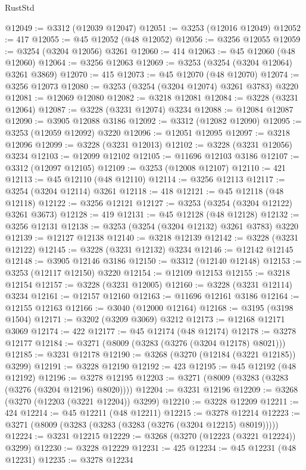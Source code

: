 \begin{lexlean}{RustStd}
\begin{coremodule}
@12049 := @3312 (@12039 @12047)
@12051 := @3253 (@12016 @12049)
@12052 := 417
@12055 := @45 @12052 (@48 @12052)
@12056 := @3256 @12055
@12059 := @3254 (@3204 @12056) @3261
@12060 := 414
@12063 := @45 @12060 (@48 @12060)
@12064 := @3256 @12063
@12069 := @3253 (@3254 (@3204 @12064) @3261 @3869)
@12070 := 415
@12073 := @45 @12070 (@48 @12070)
@12074 := @3256 @12073
@12080 := @3253 (@3254 (@3204 @12074) @3261 @3783) @3220
@12081 := @12069 @12080
@12082 := @3218 @12081
@12084 := @3228 (@3231 @12064)
@12087 := @3228 (@3231 @12074) @3234
@12088 := @12084 @12087
@12090 := @3905 @12088 @3186
@12092 := @3312 (@12082 @12090)
@12095 := @3253 (@12059 @12092) @3220
@12096 := @12051 @12095
@12097 := @3218 @12096
@12099 := @3228 (@3231 @12013)
@12102 := @3228 (@3231 @12056) @3234
@12103 := @12099 @12102
@12105 := @11696 @12103 @3186
@12107 := @3312 (@12097 @12105)
@12109 := @3253 (@12008 @12107)
@12110 := 421
@12113 := @45 @12110 (@48 @12110)
@12114 := @3256 @12113
@12117 := @3254 (@3204 @12114) @3261
@12118 := 418
@12121 := @45 @12118 (@48 @12118)
@12122 := @3256 @12121
@12127 := @3253 (@3254 (@3204 @12122) @3261 @3673)
@12128 := 419
@12131 := @45 @12128 (@48 @12128)
@12132 := @3256 @12131
@12138 := @3253 (@3254 (@3204 @12132) @3261 @3783) @3220
@12139 := @12127 @12138
@12140 := @3218 @12139
@12142 := @3228 (@3231 @12122)
@12145 := @3228 (@3231 @12132) @3234
@12146 := @12142 @12145
@12148 := @3905 @12146 @3186
@12150 := @3312 (@12140 @12148)
@12153 := @3253 (@12117 @12150) @3220
@12154 := @12109 @12153
@12155 := @3218 @12154
@12157 := @3228 (@3231 @12005)
@12160 := @3228 (@3231 @12114) @3234
@12161 := @12157 @12160
@12163 := @11696 @12161 @3186
@12164 := @12155 @12163
@12166 := @3040 (@12000 @12164)
@12168 := @3195 (@3198 @1504)
@12171 := @3202 (@3209 @3069) @3212
@12173 := @12168 @12171 @3069
@12174 := 422
@12177 := @45 @12174 (@48 @12174)
@12178 := @3278 @12177
@12184 := @3271 (@8009 (@3283 (@3276 (@3204 @12178) @8021)))
@12185 := @3231 @12178
@12190 := @3268 (@3270 (@12184 (@3221 @12185)) @3299)
@12191 := @3228 @12190
@12192 := 423
@12195 := @45 @12192 (@48 @12192)
@12196 := @3278 @12195
@12203 := @3271 (@8009 (@3283 (@3283 (@3276 (@3204 @12196) @8020))))
@12204 := @3231 @12196
@12209 := @3268 (@3270 (@12203 (@3221 @12204)) @3299)
@12210 := @3228 @12209
@12211 := 424
@12214 := @45 @12211 (@48 @12211)
@12215 := @3278 @12214
@12223 := @3271 (@8009 (@3283 (@3283 (@3283 (@3276 (@3204 @12215) @8019)))))
@12224 := @3231 @12215
@12229 := @3268 (@3270 (@12223 (@3221 @12224)) @3299)
@12230 := @3228 @12229
@12231 := 425
@12234 := @45 @12231 (@48 @12231)
@12235 := @3278 @12234

\end{coremodule}
\end{lexlean}
